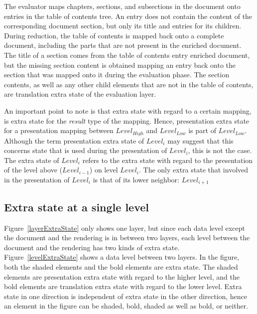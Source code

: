 The evaluator maps chapters, sections, and subsections in the document onto entries in the table of contents tree. An  entry does not contain the content of the corresponding document section, but only its title and entries for its children. During reduction, the table of contents is mapped back onto a complete document, including the parts that are not present in the enriched document. The title of a section comes from the table of contents entry enriched document, but the missing section content is obtained mapping an entry back onto the section that was mapped onto it during the evaluation phase. The section contents, as well as any other child elements that are not in the table of contents, are translation extra state of the evaluation layer.
 

An important point to note is that extra state with regard to a certain mapping, is extra state for the {\em result} type of the mapping. Hence, presentation extra state for a presentation mapping between $Level_{High}$ and $Level_{Low}$ is part of $Level_{Low}$. Although the term presentation extra state of $Level_i$ may suggest that this concerns state that is used during the presentation of $Level_i$, this is not the case. The extra state of $Level_i$ refers to the extra state with regard to the presentation of the level above ($Level_{i-1}$) on level $Level_i$. The only extra state that involved in the presentation of $Level_i$ is that of its lower neighbor: $Level_{i+1}$


%																
\subsection{Extra state at a single level}

Figure~\ref{layerExtraState} only shows one layer, but since each data level except the document and the rendering is in between two layers, each level between the document and the rendering has two kinds of extra state. Figure~\ref{levelExtraState} shows a data level between two layers. In the figure, both the shaded elements and the bold elements are extra state. The shaded elements are presentation extra state with regard to the higher level, and the bold elements are translation extra state with regard to the lower level. Extra state in one direction is independent of extra state in the other direction, hence an element in the figure can be shaded, bold, shaded as well as bold, or neither. 

